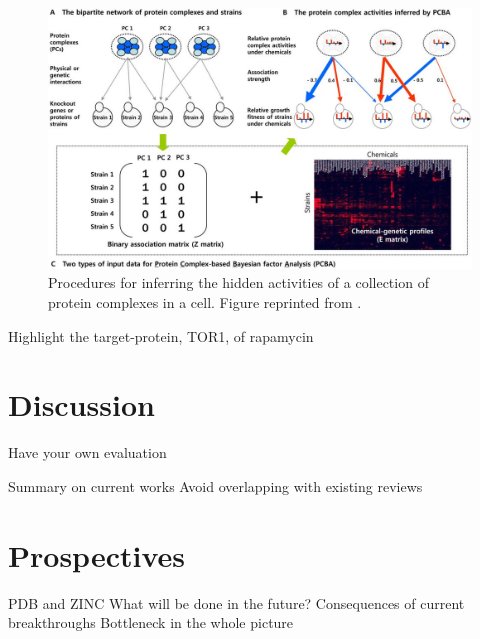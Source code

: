 \documentclass[12pt,conference,compsocconf]{../IEEEtran}
\begin{document}
\begin{figure}
\centering
\includegraphics[width=\linewidth]{1079-2.png}
\caption{Procedures for inferring the hidden activities of a collection of protein complexes in a cell. Figure reprinted from \citep{1079}.}
\label{fig:1079-2}
\end{figure}

Highlight the target-protein, TOR1, of rapamycin

\section{Discussion}

Have your own evaluation

Summary on current works
  Avoid overlapping with existing reviews

\section{Prospectives}

PDB \citep{105} and ZINC \citep{532}
What will be done in the future?
  Consequences of current breakthroughs
  Bottleneck in the whole picture



\end{document}

